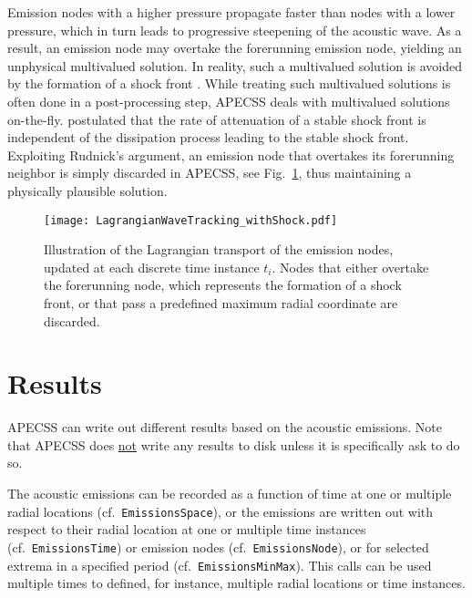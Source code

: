 Emission nodes with a higher pressure propagate faster than nodes with a lower pressure, which in turn leads to progressive steepening of the acoustic wave. As a result, an emission node may overtake the forerunning emission node, yielding an unphysical multivalued solution. In reality, such a multivalued solution is avoided by the formation of a shock front \citep{Fay1931}. While treating such multivalued solutions is often done in a post-processing step, APECSS deals with multivalued solutions on-the-fly. \citet{Rudnick1952} postulated that the rate of attenuation of a stable shock front is independent of the dissipation process leading to the stable shock front. Exploiting Rudnick's argument, an emission node that overtakes its forerunning neighbor is simply discarded in APECSS, see Fig.~\ref{fig:lagrangiantrackingshock}, thus maintaining a physically plausible solution.

\begin{figure}
    \begin{center}
    \texttt{[image: LagrangianWaveTracking\_withShock.pdf]}
    \caption{Illustration of the Lagrangian transport of the emission nodes, updated at each discrete time instance $t_i$. Nodes that either overtake the forerunning node, which represents the formation of a shock front, or that pass a predefined maximum radial coordinate are discarded.}
    \label{fig:lagrangiantrackingshock}
    \end{center}
\end{figure}


\section{Results}

APECSS can write out different results based on the acoustic emissions. Note that APECSS does \uline{not} write any results to disk unless it is specifically ask to do so.

The acoustic emissions can be recorded as a function of time at one or multiple radial locations (cf.~{\tt EmissionsSpace}), or the emissions are written out with respect to their radial location at one or multiple time instances (cf.~{\tt EmissionsTime}) or emission nodes (cf.~{\tt EmissionsNode}), or for selected extrema in a specified period (cf.~{\tt EmissionsMinMax}). This calls can be used multiple times to defined, for instance, multiple radial locations or time instances.

\vspace{0.8em}

